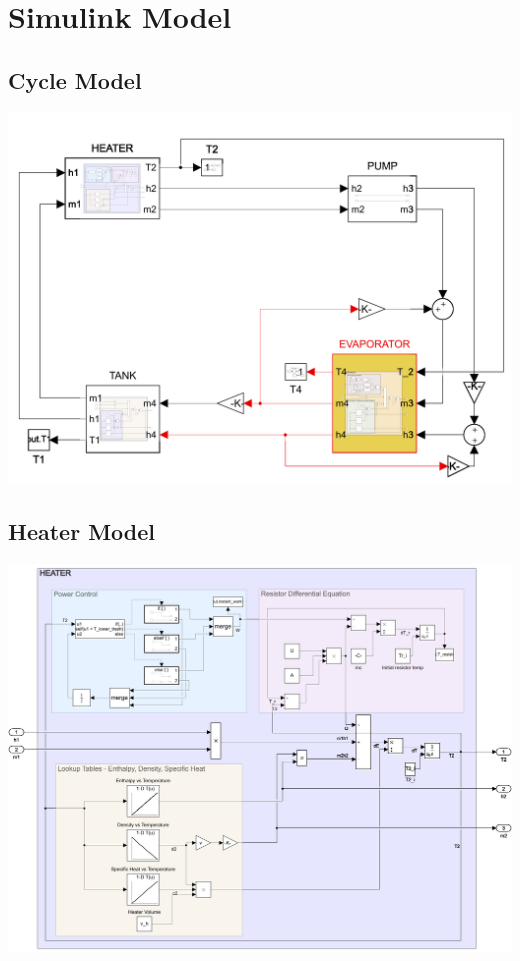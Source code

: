 \chapter{Simulink Model}
\label{appa}

\section{Cycle Model}
\includegraphics[width=16cm]{images/total-model.png}

\section{Heater Model}
\includegraphics[width=16cm]{images/heater-model.png}


